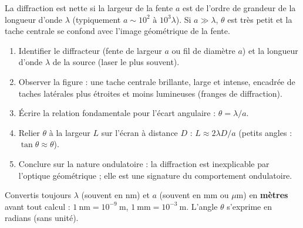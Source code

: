 \documentclass[11pt]{article}
\newcommand{\cle}[1]{{\popxbold\color{popdark}#1}}
\begin{document}
\begin{aretenir}
La diffraction est nette si la largeur de la fente $a$ est de l'ordre de grandeur de la longueur d'onde $\lambda$ (typiquement $a \sim 10^2 \text{ à } 10^3 \lambda$). Si $a \gg \lambda$, $\theta$ est très petit et la tache centrale se confond avec l'image géométrique de la fente.
\end{aretenir}

\begin{methode}
\begin{enumerate}
\item \cle{Identifier} le diffracteur (fente de largeur $a$ ou fil de diamètre $a$) et la longueur d'onde $\lambda$ de la source (laser le plus souvent).
\item \cle{Observer} la figure : une tache centrale brillante, large et intense, encadrée de taches latérales plus étroites et moins lumineuses (franges de diffraction).
\item \cle{Écrire} la relation fondamentale pour l'écart angulaire : $\theta = \lambda/a$.
\item \cle{Relier} $\theta$ à la largeur $L$ sur l'écran à distance $D$ : $L \approx 2\lambda D/a$ (petits angles : $\tan\theta \approx \theta$).
\item \cle{Conclure} sur la nature ondulatoire : la diffraction est inexplicable par l'optique géométrique ; elle est une signature du comportement ondulatoire.
\end{enumerate}
\begin{attention}
Convertis toujours $\lambda$ (souvent en nm) et $a$ (souvent en mm ou $\mu$m) en \textbf{mètres} avant tout calcul : $1\ \text{nm} = 10^{-9}\ \text{m}$, $1\ \text{mm} = 10^{-3}\ \text{m}$. L'angle $\theta$ s'exprime en radians (sans unité).
\end{attention}
\end{methode}
\end{document}
